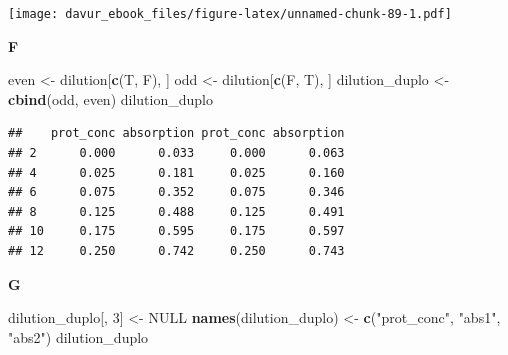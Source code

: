 \documentclass[]{book}
\newenvironment{Shaded}{\begin{snugshade}}{\end{snugshade}}
\newcommand{\CommentTok}[1]{\textcolor[rgb]{0.56,0.35,0.01}{\textit{#1}}}
\newcommand{\DataTypeTok}[1]{\textcolor[rgb]{0.13,0.29,0.53}{#1}}
\newcommand{\DecValTok}[1]{\textcolor[rgb]{0.00,0.00,0.81}{#1}}
\newcommand{\FloatTok}[1]{\textcolor[rgb]{0.00,0.00,0.81}{#1}}
\newcommand{\KeywordTok}[1]{\textcolor[rgb]{0.13,0.29,0.53}{\textbf{#1}}}
\newcommand{\NormalTok}[1]{#1}
\newcommand{\OperatorTok}[1]{\textcolor[rgb]{0.81,0.36,0.00}{\textbf{#1}}}
\newcommand{\OtherTok}[1]{\textcolor[rgb]{0.56,0.35,0.01}{#1}}
\newcommand{\StringTok}[1]{\textcolor[rgb]{0.31,0.60,0.02}{#1}}
\begin{document}
\begin{Shaded}
\end{Shaded}

\texttt{[image: davur\_ebook\_files/figure-latex/unnamed-chunk-89-1.pdf]}

\textbf{F}

\begin{Shaded}
\begin{Highlighting}[]
\NormalTok{even <-}\StringTok{ }\NormalTok{dilution[}\KeywordTok{c}\NormalTok{(T, F), ]}
\NormalTok{odd <-}\StringTok{ }\NormalTok{dilution[}\KeywordTok{c}\NormalTok{(F, T), ]}
\NormalTok{dilution_duplo <-}\StringTok{ }\KeywordTok{cbind}\NormalTok{(odd, even)}
\NormalTok{dilution_duplo}
\end{Highlighting}
\end{Shaded}

\begin{verbatim}
##    prot_conc absorption prot_conc absorption
## 2      0.000      0.033     0.000      0.063
## 4      0.025      0.181     0.025      0.160
## 6      0.075      0.352     0.075      0.346
## 8      0.125      0.488     0.125      0.491
## 10     0.175      0.595     0.175      0.597
## 12     0.250      0.742     0.250      0.743
\end{verbatim}

\textbf{G}

\begin{Shaded}
\begin{Highlighting}[]
\NormalTok{dilution_duplo[, }\DecValTok{3}\NormalTok{] <-}\StringTok{ }\OtherTok{NULL}
\KeywordTok{names}\NormalTok{(dilution_duplo) <-}\StringTok{ }\KeywordTok{c}\NormalTok{(}\StringTok{"prot_conc"}\NormalTok{, }\StringTok{"abs1"}\NormalTok{, }\StringTok{"abs2"}\NormalTok{)}
\NormalTok{dilution_duplo}
\end{Highlighting}
\end{Shaded}
\end{document}
